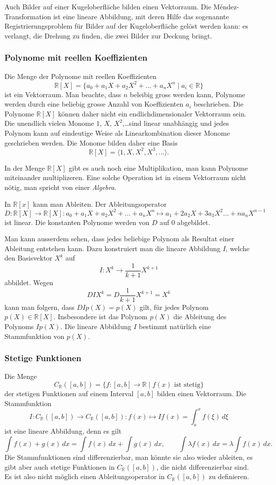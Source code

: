 Auch Bilder auf einer Kugeloberfläche bilden einen Vektorraum.
Die Méndez-Transformation ist eine lineare Abbildung, mit deren Hilfe
das sogenannte Registrierungsproblem für Bilder auf der Kugeloberfläche
gelöst werden kann: es verlangt, die Drehung zu finden, die zwei Bilder
zur Deckung bringt.

\subsubsection{Polynome mit reellen Koeffizienten}
Die Menge der Polynome mit reellen Koeffizienten
\[
\mathbb R[X]
=
\{
a_0 + a_1X + a_2X^2 + \dots + a_nX^n
\;|\;
a_i\in\mathbb R
\}
\]
ist ein Vektorraum.
Man beachte, dass $n$ beleibig gross werden kann, Polynome werden durch
eine beliebig grosse Anzahl von Koeffizienten $a_i$ beschrieben.
Die Polynome $\mathbb R[X]$ können daher nicht ein endlichdimensionaler
Vektorraum sein.
Die unendlich vielen Monome $1$, $X$, $X^2$,\dots sind linear unabhängig
und jedes Polynom kann auf eindeutige Weise als Linearkombination dieser
Monome geschrieben werden.
Die Monome bilden daher eine Basis
\[
\mathbb R[X] = \langle 1,X,X^2,X^3,\dots\rangle.
\]

In der Menge $\mathbb R[X]$ gibt es auch noch eine Multiplikation, man
kann Polynome miteinander multiplizeren.
Eine solche Operation ist in einem Vektorraum nicht nötig, man spricht
von einer {\em Algebra}.
%

In $\mathbb R[x]$ kann man Ableiten.
Der Ableitungsoperator
\[
D\colon \mathbb R[X] \to \mathbb R[X]:
a_0+a_1X+a_2X^2+\dots +a_nX^n
\mapsto
a_1+2a_2X+3a_3X^2\dots +na_nX^{n-1}
\]
ist linear.
Die konstanten Polynome werden von $D$ auf $0$ abgebildet.

Man kann ausserdem sehen, dass jedes beliebige Polynom als Resultat
einer Ableitung entstehen kann.
Dazu konstruiert man die lineare Abbildung $I$, welche den Basisvektor
$X^k$ auf
\[
I\colon X^k \to \frac{1}{k+1} X^{k+1}
\]
abbildet.
Wegen
\[
DIX^k = D\frac{1}{k+1}X^{k+1}=X^k
\]
kann man folgern, dass $DIp(X)=p(X)$ gilt, für jedes Polynom
$p(X)\in\mathbb R[X]$.
Insbesondere ist das Polynom $p(X)$ die Ableitung des Polynoms $Ip(X)$.
Die lineare Abbildung $I$ bestimmt natürlich eine Stammfunktion von $p(X)$.


\subsubsection{Stetige Funktionen}
Die Menge
\[
C_{\mathbb R}([a,b]) = \{f:[a,b]\to\mathbb R\;|\; \text{$f(x)$ ist stetig}\}
\]
der stetigen Funktionen auf einem Interval $[a,b]$ bilden einen
Vektorraum.
Die Stammfunktion
\[
I
\colon
C_{\mathbb R}([a,b]) \to C_{\mathbb R}([a,b])
:
f(x) \mapsto If(x) = \int_a^x f(\xi)\,d\xi
\]
ist eine lineare Abbildung, denn es gilt
\[
\int f(x)+g(x)\,dx = \int f(x)\,dx + \int g(x)\,dx,
\qquad
\int \lambda f(x)\,dx = \lambda\int f(x)\,dx.
\]
Die Stammfunktionen sind differenzierbar, man könnte sie also wieder ableiten,
es gibt aber auch stetige Funktionen in $C_{\mathbb R}([a,b])$, die nicht
differenzierbar sind.
Es ist also nicht möglich einen Ableitungsoperator in $C_{\mathbb R}([a,b])$
zu definieren.

